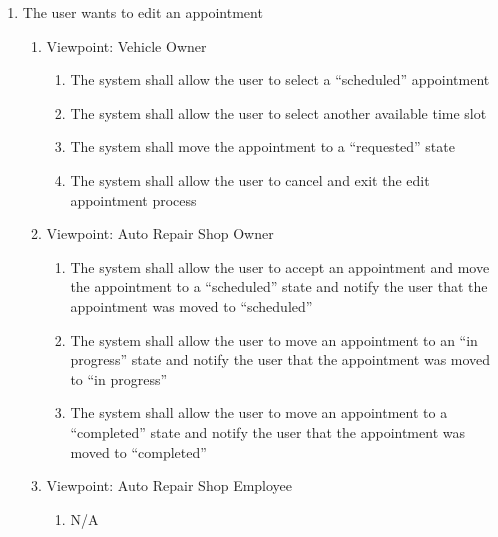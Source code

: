 \documentclass[12pt]{article}
\begin{document}
\begin{enumerate}[resume*=business_events]
	\item The user wants to edit an appointment
	      \begin{enumerate}[VP\arabic*.]
		      \item Viewpoint: Vehicle Owner
		            \begin{enumerate}
			            \item The system shall allow the user to select a ``scheduled'' appointment
			            \item The system shall allow the user to select another available time slot
			            \item The system shall move the appointment to a ``requested'' state
			            \item The system shall allow the user to cancel and exit the edit appointment process
		            \end{enumerate}
		      \item Viewpoint: Auto Repair Shop Owner
		            \begin{enumerate}
			            \item The system shall allow the user to accept an appointment and move the appointment to a
			                  ``scheduled'' state and notify the user that the appointment was moved to ``scheduled''
			            \item The system shall allow the user to move an appointment to an ``in progress'' state and notify the
			                  user that the appointment was moved to ``in progress''
			            \item The system shall allow the user to move an appointment to a ``completed'' state and notify the user
			                  that the appointment was moved to ``completed''
		            \end{enumerate}
		      \item Viewpoint: Auto Repair Shop Employee
		            \begin{enumerate}
			            \item[] N/A
		            \end{enumerate}
	      \end{enumerate}


\end{enumerate}
\end{document}
